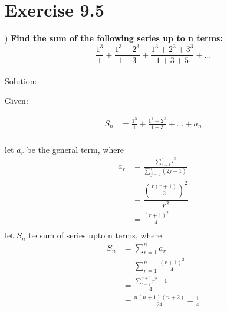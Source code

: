 \documentclass[journal,12pt,twocolumn]{article}
\begin{document}


\vspace{3cm}

\title{}
\author{EE23BTECH11217 - Prajwal M$^{*}$
}
\maketitle
\newpage
\bigskip

\renewcommand{\thefigure}{\theenumi}
\renewcommand{\thetable}{\theenumi}

\section*{Exercise 9.5}
) \hspace{2pt} \textbf{Find the sum of the following series up to n terms:}
\[
\frac{1^3}{1} + \frac{1^3 + 2^3}{1 + 3} + \frac{1^3 + 2^3 + 3^3}{1 + 3 + 5} + \ldots
\] \\

\noindent Solution: 

\noindent Given:

\begin{align*}
    S_n & = \frac{1^3}{1} + \frac{1^3 + 2^3}{1 + 3} + \ldots + a_n \\
\end{align*}

let \(a_r\) be the general term, where
\begin{align*}
    a_r & = \frac{\sum_{i=1}^{r} i^3}{\sum_{j=1}^{r} (2j-1)} \\
    & = \dfrac{\left(\frac{r(r + 1)}{2}\right)^2 }{r^2} \\
    & = \frac{(r + 1)^2}{4} \\
\end{align*}
let \(S_n\) be sum of series upto n terms, where
\begin{align*}
    S_n & = \sum_{r=1}^{n} a_r \\
    & = \sum_{r=1}^{n} \frac{(r + 1)^2}{4} \\
    & = \frac{\sum_{r=1}^{n+1} r^2 - 1}{4} \\
    & = \frac{n(n+1)(n+2)}{24} - \frac{1}{4} \\
\end{align*}
\end{document}
